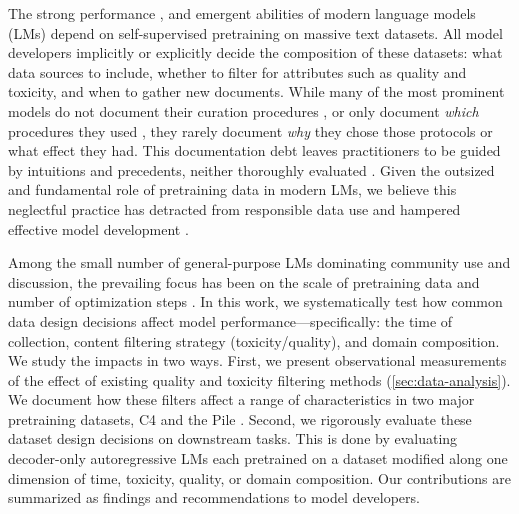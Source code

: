 \documentclass{article}
\begin{document}
The strong performance \citep{chowdhery2022palm, chinchilla2022implications,openai2023gpt4,google2023}, and emergent abilities \citep{wei2022emergent} of modern language models (LMs) depend on self-supervised pretraining on massive text datasets.
All model developers implicitly or explicitly decide the composition of these datasets: what data sources to include, whether to filter for attributes such as quality and toxicity, and when to gather new documents.
While many of the most prominent models do not document their curation procedures \citep{openai2023gpt4,google2023}, or only document \textit{which} procedures they used \citep{brown2020language,chinchilla2022implications,scao2022bloom,touvron2023llama}, they rarely document \textit{why} they chose those protocols or what effect they had.
This documentation debt leaves practitioners to be guided by intuitions and precedents, neither thoroughly evaluated \citep{bandy2021addressing, sambasivan2021everyone}.
Given the outsized and fundamental role of pretraining data in modern LMs, we believe this neglectful practice has detracted from responsible data use and hampered effective model development \citep{rogers2021changing, gebru2021datasheets, bender2018data}.

Among the small number of general-purpose LMs dominating community use and discussion, the prevailing focus has been on the scale of pretraining data and number of optimization steps \citep{brown2020language,chinchilla2022implications,google2023}.
In this work, we systematically test how common data design decisions affect model performance---specifically: the time of collection, content filtering strategy (toxicity/quality), and domain composition.
We study the impacts in two ways. 
First, we present observational measurements of the effect of existing quality and toxicity filtering methods (\cref{sec:data-analysis}). 
We document how these filters affect a range of characteristics in two major pretraining datasets, C4 \citep{raffel2020exploring} and the Pile \citep{gao2020pile}.
Second, we rigorously evaluate these dataset design decisions on downstream tasks.
This is done by evaluating decoder-only autoregressive LMs each pretrained on a dataset modified along one dimension of time, toxicity, quality, or domain composition. 
Our contributions are summarized as findings and recommendations to model developers.
\end{document}
